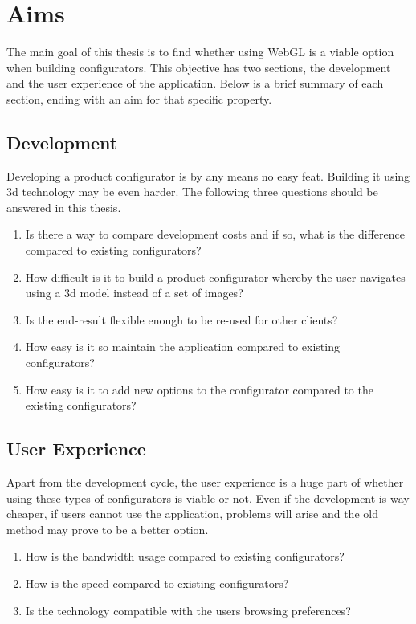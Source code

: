 \chapter{Aims}
The main goal of this thesis is to find whether using WebGL is a viable option when building configurators. This objective has two sections, the development and the user experience of the application. Below is a brief summary of each section, ending with an aim for that specific property.
\section{Development}
Developing a product configurator is by any means no easy feat. Building it using 3d technology may be even harder. The following three questions should be answered in this thesis.
​\begin{enumerate}
\item Is there a way to compare development costs and if so, what is the difference compared to existing configurators?
\item How difficult is it to build a product configurator whereby the user navigates using a 3d model instead of a set of images?
\item Is the end-result flexible enough to be re-used for other clients?
\item How easy is it so maintain the application compared to existing configurators?
\item How easy is it to add new options to the configurator compared to the existing configurators?
\end{enumerate}

\section{User Experience}
Apart from the development cycle, the user experience is a huge part of whether using these types of configurators is viable or not. Even if the development is way cheaper, if users cannot use the application, problems will arise and the old method may prove to be a better option.\begin{enumerate}
\item How is the bandwidth usage compared to existing configurators?
\item How is the speed compared to existing configurators?
\item Is the technology compatible with the users browsing preferences?
\end{enumerate}